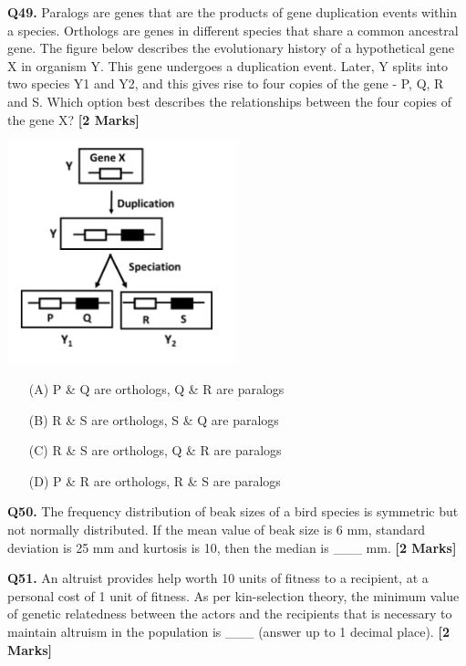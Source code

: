\documentclass[11pt]{article}
\newcommand{\questionb}[2]{
    \noindent\textbf{Q#2.} #1 \hfill \textbf{[2 Marks]}
}
\begin{document}
\questionb{Paralogs are genes that are the products of gene duplication events within a species. Orthologs are genes in different species that share a common ancestral gene. The figure below describes the evolutionary history of a hypothetical gene X in organism Y. This gene undergoes a duplication event. Later, Y splits into two species Y1 and Y2, and this gives rise to four copies of the gene - P, Q, R and S. Which option best describes the relationships between the four copies of the gene X?}{49}
\begin{center}
\includegraphics[width=0.5\textwidth]{figures/49}
\end{center}
\begin{enumerate}
    \item[(A)] P \& Q are orthologs, Q \& R are paralogs
    \item[(B)] R \& S are orthologs, S \& Q are paralogs
    \item[(C)] R \& S are orthologs, Q \& R are paralogs
    \item[(D)] P \& R are orthologs, R \& S are paralogs
\end{enumerate}
\vspace{0.5cm}

\questionb{The frequency distribution of beak sizes of a bird species is symmetric but not normally distributed. If the mean value of beak size is 6 mm, standard deviation is 25 mm and kurtosis is 10, then the median is \_\_\_ mm.}{50}
\vspace{0.5cm}

\questionb{An altruist provides help worth 10 units of fitness to a recipient, at a personal cost of 1 unit of fitness. As per kin-selection theory, the minimum value of genetic relatedness between the actors and the recipients that is necessary to maintain altruism in the population is \_\_\_ (answer up to 1 decimal place).}{51}
\vspace{0.5cm}
\end{document}
